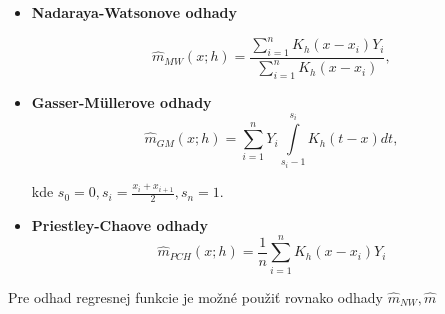 \begin{itemize}
\item  \textbf{Nadaraya-Watsonove odhady}

\begin{equation*}
\hat{m}_{MW}(x;h) = \frac{\sum\limits_{i=1}^{n} K_h(x - x_i)Y_i}{\sum\limits_{i=1}^{n} K_h(x - x_i)},
\end{equation*}

\item
\textbf{Gasser-Müllerove odhady}
\begin{equation*}
\hat{m}_{GM}(x;h) = \sum\limits_{i=1}^{n} Y_i \int\limits_{s_i-1}^{s_i}K_h(t-x)dt,
\end{equation*}

kde $s_0 = 0 , s_i = \frac{x_i + x_{i+1}}{2}, s_n = 1$.

\item
 \textbf{Priestley-Chaove odhady}
\begin{equation*}
\hat{m}_{PCH}(x;h) = \frac{1}{n}\sum\limits_{i=1}^{n}K_h(x-x_i)Y_i
\end{equation*}
\end{itemize}

Pre odhad regresnej funkcie je možné použiť rovnako odhady $\hat{m}_{NW}, \hat{m}_{} $ 